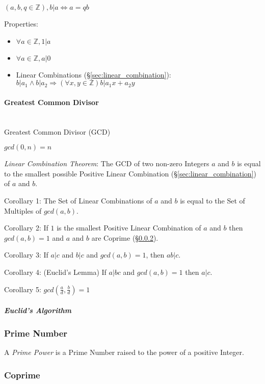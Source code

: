 $(a,b,q \in \mathbb{Z}), b|a \Leftrightarrow a = qb$

Properties:

\begin{itemize}
\item $\forall a \in \mathbb{Z}, 1|a$
\item $\forall a \in \mathbb{Z}, a|0$
\item Linear Combinations (\S\ref{sec:linear_combination}): $b|a_1
  \wedge b|a_2 \Rightarrow (\forall x,y \in \mathbb{Z})b|a_1 x + a_2
  y$
\end{itemize}



\paragraph{Greatest Common Divisor}\label{sec:gcd}
\hfill \\

Greatest Common Divisor (GCD)

$gcd(0,n) = n$

\emph{Linear Combination Theorem}: The GCD of two non-zero Integers
$a$ and $b$ is equal to the smallest possible Positive Linear
Combination (\S\ref{sec:linear_combination}) of $a$ and $b$.

Corollary 1: The Set of Linear Combinations of $a$ and $b$ is equal to
the Set of Multiples of $gcd(a,b)$.

Corollary 2: If $1$ is the smallest Positive Linear Combination of $a$
and $b$ then $gcd(a,b) = 1$ and $a$ and $b$ are Coprime
(\S\ref{sec:coprime}).

Corollary 3: If $a|c$ and $b|c$ and $gcd(a,b) = 1$, then $ab|c$.

Corollary 4: (Euclid's Lemma) If $a | bc$ and $gcd(a,b) = 1$ then
$a|c$.

Corollary 5: $gcd(\frac{a}{d}, \frac{b}{d}) = 1$



\subparagraph{Euclid's Algorithm}\label{sec:euclids_algorithm}



\subsubsection{Prime Number}\label{sec:prime_number}

A \emph{Prime Power} is a Prime Number raised to the power of a
positive Integer.



\subsubsection{Coprime}\label{sec:coprime}



